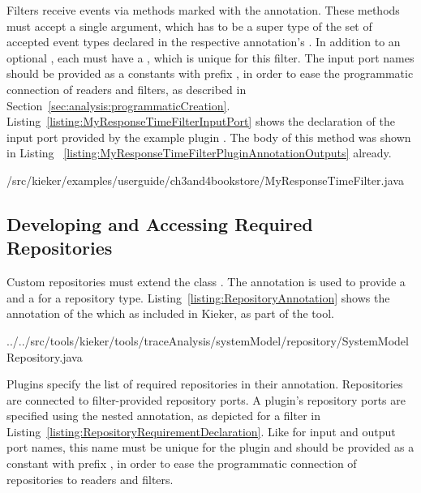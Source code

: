 Filters receive events via methods marked with the  %
annotation. These methods must accept a single argument, which has to be %
a super type of the set of accepted event types declared in the respective %
 annotation's . %
In addition to an optional , each  %
must have a , which is unique for this filter. The input port names %
should be provided as a  constants %
with prefix , in order to ease the programmatic %
connection of readers and filters, as described in %
Section~\ref{sec:analysis:programmaticCreation}. %
Listing~\ref{listing:MyResponseTimeFilterInputPort} shows the declaration %
of the input port provided by the example plugin . %
The body of this method was shown in Listing~%
\ref{listing:MyResponseTimeFilterPluginAnnotationOutputs} already.

\pagebreak

\setJavaCodeListing
%
{\customComponentsBookstoreApplicationDir/src/kieker/examples/userguide/ch3and4bookstore/MyResponseTimeFilter.java}

\subsection{Developing and Accessing Required Repositories}\label{sec:analysis:repositories}

Custom repositories must extend the class . %
The  annotation is used to provide a  %
and a  for a repository type. %
Listing~\ref{listing:RepositoryAnnotation} shows the  annotation %
of the  which as included in Kieker, as part of the %
\KiekerTraceAnalysis{} tool. %

\setJavaCodeListing
%
{../../src/tools/kieker/tools/traceAnalysis/systemModel/repository/SystemModelRepository.java}

\noindent Plugins specify the list of required repositories in their %
 annotation. Repositories are connected to filter-provided %
repository ports. A plugin's repository ports are specified using the %
nested  annotation, as depicted for a %
\KiekerTraceAnalysis{} filter in Listing~\ref{listing:RepositoryRequirementDeclaration}. %
Like for input and output port names, this name must be unique for the plugin %
and should be provided as a  constant %
with prefix , in order to ease the programmatic %
connection of repositories to readers and filters. %

